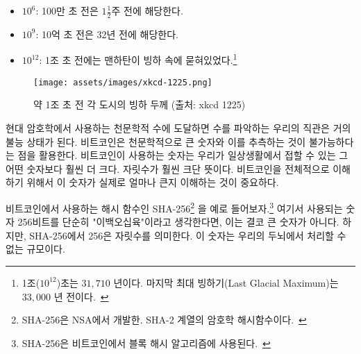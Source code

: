 \begin{itemize}
	\item $10^6$: 100만 초 전은 $1 \frac{1}{2}$주 전에 해당한다.
	\item $10^9$: 10억 초 전은 32년 전에 해당한다.
	\item $10^{12}$: 1조 초 전에는 맨하탄이 빙하 속에 묻혀있었다.\footnote{1조($10^{12}$)초는 $31,710$ 년이다. 마지막 최대 빙하기(Last  Glacial Maximum)는 $33,000$ 년 전이다.~\cite{wiki:LGM}}
\end{itemize}

\begin{figure}
	\texttt{[image: assets/images/xkcd-1225.png]}
	\caption{약 1조 초 전 각 도시의 빙하 두께 (출처: xkcd 1225)}
	\label{fig:xkcd-1225}
\end{figure}

\begin{comment}
	As soon as we enter the beyond-astronomical realm of modern
	cryptography, our intuition fails catastrophically. Bitcoin is built
	around large numbers and the virtual impossibility of guessing them.
	These numbers are way, way larger than anything we might encounter in
	day-to-day life. Many orders of magnitude larger. Understanding how
	large these numbers truly are is essential to understanding Bitcoin as a
	whole.
\end{comment}
현대 암호학에서 사용하는 천문학적 수에 도달하면 수를 파악하는 우리의 직관은 거의 불능 상태가 된다.
비트코인은 천문학적으로 큰 숫자와 이를 추측하는 것이 불가능하다는 점을 활용한다.
비트코인이 사용하는 숫자는 우리가 일상생활에서 접할 수 있는 그 어떤 숫자보다 훨씬 더 크다. 자릿수가 훨씬 크단 뜻이다.
비트코인을 전체적으로 이해하기 위해서 이 숫자가 실제로 얼마나 큰지 이해하는 것이 중요하다.

\begin{comment}
	Let's take SHA-256\footnote{SHA-256 is part of the SHA-2 family of cryptographic
		hash functions developed by the NSA.~\cite{wiki:sha2}}, one of the hash
	functions\footnote{Bitcoin uses SHA-256 in its block hashing
		algorithm.~\cite{btcwiki:block-hashing}} used in Bitcoin, as a concrete example.
	It is only natural to think about 256 bits as \enquote{two hundred fifty-six,} which
	isn't a large number at all. However, the number in SHA-256 is talking about
	orders of magnitude --- something our brains are not well-equipped to deal with.
\end{comment}
비트코인에서 사용하는 해시 함수인 SHA-256\footnote{SHA-256은 NSA에서 개발한. SHA-2 계열의 암호학 해시함수이다.~\cite{wiki:sha2}}
을 예로 들어보자.\footnote{SHA-256은 비트코인에서 블록 해시 알고리즘에 사용된다.~\cite{btcwiki:block-hashing}} 
여기서 사용되는 숫자 256비트를 단순히 "이백오십육"이라고 생각한다면, 이는 결코 큰 숫자가 아니다.
하지만, SHA-256에서 256은 자릿수를 의미한다. 이 숫자는 우리의 두뇌에서 처리할 수 없는 규모이다.

